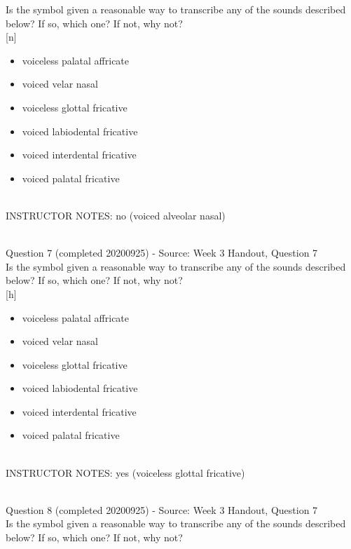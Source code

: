 \documentclass[12pt]{article}
\begin{document}
Is the symbol given a reasonable way to transcribe any of the sounds described below? If so, which one? If not, why not?\\

{[n]}

\begin{itemize} \item voiceless palatal affricate \item voiced velar nasal \item voiceless glottal fricative \item voiced labiodental fricative \item voiced interdental fricative \item voiced palatal fricative \end{itemize}


~\\
INSTRUCTOR NOTES: no (voiced alveolar nasal)


~\\

{\large Question 7} (completed 20200925) - Source: Week 3 Handout, Question 7\\

Is the symbol given a reasonable way to transcribe any of the sounds described below? If so, which one? If not, why not?\\

{[h]}

\begin{itemize} \item voiceless palatal affricate \item voiced velar nasal \item voiceless glottal fricative \item voiced labiodental fricative \item voiced interdental fricative \item voiced palatal fricative \end{itemize}


~\\
INSTRUCTOR NOTES: yes (voiceless glottal fricative)


~\\

{\large Question 8} (completed 20200925) - Source: Week 3 Handout, Question 7\\

Is the symbol given a reasonable way to transcribe any of the sounds described below? If so, which one? If not, why not?\\
\end{document}
